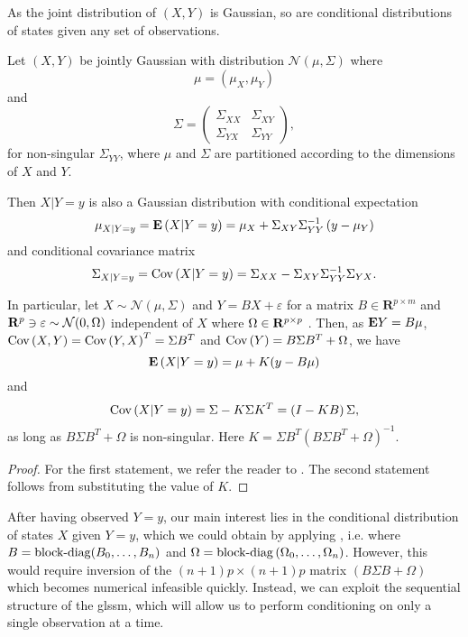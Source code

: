 As the joint distribution of $(X, Y)$ is Gaussian, so are conditional distributions of states given any set of observations.

\begin{lemma}
    \label{lem:gaussian_conditional}
    Let $(X,Y)$ be jointly Gaussian with distribution $\mathcal N \left( \mu, \Sigma \right)$ where 
    $$
    \mu = \left(\mu_{X}, \mu_{Y}\right)
    $$
    and 
    $$
    \Sigma = \begin{pmatrix}
        \Sigma_{XX} & \Sigma_{XY} \\
        \Sigma_{YX} & \Sigma_{YY}
    \end{pmatrix},
    $$
    for non-singular $\Sigma_{YY}$, where $\mu$ and $\Sigma$ are partitioned according to the dimensions of $X$ and $Y$. 
    
    Then $X|Y = y$ is also a Gaussian distribution with conditional expectation
    $$
    \mu_{X|Y = y} = \mathbf E \left( X | Y = y \right) = \mu_{X} + \Sigma_{XY}\Sigma_{YY}^{-1} \left( y - \mu_{Y} \right)
    $$
    and conditional covariance matrix 
    $$
    \Sigma_{X| Y =y} = \text{Cov} \left( X | Y = y \right) = \Sigma_{XX} - \Sigma_{XY} \Sigma_{YY}^{-1} \Sigma_{YX}.
    $$
    
    In particular, let $X\sim \mathcal N(\mu, \Sigma)$ and $Y = BX + \varepsilon$ for a matrix $B \in \mathbf R^{p\times m}$ and $\mathbf R^{p} \ni \varepsilon \sim \mathcal N(0, \Omega)$ independent of $X$ where $\Omega \in \mathbf R^{p\times p}$ . 
    Then, as 
    $\mathbf E Y = B \mu$, $\text{Cov} \left( X,Y \right) = \text{Cov} \left( Y, X \right)^{T}= \Sigma B^{T}$ and $\text{Cov} \left( Y \right) = B \Sigma B^{T} + \Omega$, we have
    $$
        \mathbf E \left( X | Y = y \right) = \mu + K (y - B \mu)
    $$
    and 
    $$
    \text{Cov} \left( X | Y = y \right) = \Sigma - K \Sigma K^{T} = \left( I  -  KB \right) \Sigma,
    $$
    as long as $B \Sigma B^{T} + \Omega$ is non-singular.
    Here $K = \Sigma B^{T} \left( B \Sigma B^{T} + \Omega \right)^{-1}$.
\end{lemma}
\begin{proof}
    For the first statement, we refer the reader to \citep[Chapter 4, Lemma 1]{Durbin2012Time}. The second statement follows from substituting the value of $K$.
\end{proof}

After having observed $Y = y$, our main interest lies in the conditional distribution of states $X$ given $Y= y$, which we could obtain by applying , i.e. where $B = \operatorname{block-diag} (B_{0}, \dots, B_{n})$ and $\Omega = \operatorname{block-diag} \left( \Omega_{0}, \dots, \Omega_{n} \right)$. However, this would require inversion of the $(n+1)p\times(n+1)p$ matrix $\left( B\Sigma B + \Omega \right)$ which becomes numerical infeasible quickly. Instead, we can exploit the sequential structure of the \acrshort{glssm}, which will allow us to perform conditioning on only a single observation at a time. 

